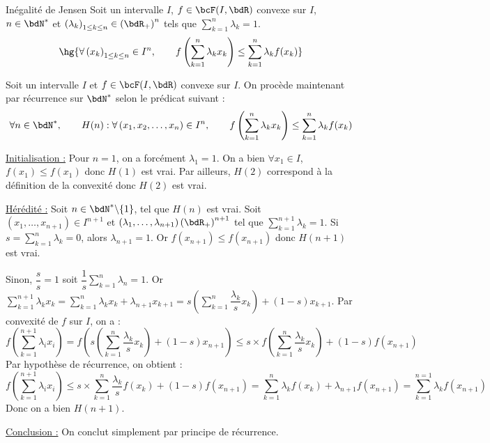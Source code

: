\documentclass[a4paper,french,bookmarks]{report}
\begin{document}
\begin{theorem}{Inégalité de Jensen}{}
    Soit un intervalle $I$, $f \in \bcF(I, \bdR)$ convexe sur $I$, $n \in \bdN^*$ et $\left(\lambda_k\right)_{1 \leq k \leq n} \in \left(\bdR_+\right)^n$ tels que $ \sum_{k=1}^n \lambda_k = 1$.
    \[ \hg{\forall \left(x_k\right)_{1 \leq k \leq n} \in I^n,\qquad f\left(\sum_{k=1}^n \lambda_kx_k\right) \leq \sum_{k=1}^n \lambda_kf(x_k)}\]
\end{theorem}

\begin{nproof}
    Soit un intervalle $I$ et $f \in \bcF(I, \bdR)$ convexe sur $I$. On procède maintenant par récurrence sur $\bdN^*$ selon le prédicat suivant :
    \[ \forall n \in \bdN^*,\qquad H(n) : \forall \left(x_1, x_2, \dots, x_n\right) \in I^n,\qquad f\left(\sum_{k=1}^n \lambda_kx_k\right) \leq \sum_{k=1}^n \lambda_kf(x_k)\]
    \begin{enumerate}
        \itt \underline{Initialisation :} Pour $n=1$, on a forcément $\lambda_1 = 1$. On a bien $\forall x_1 \in I$, $f(x_1) \leq f(x_1)$ donc $H(1)$ est vrai. Par ailleurs, $H(2)$ correspond à la définition de la convexité donc $H(2)$ est vrai.
            
        \itt \underline{Hérédité :} Soit $n \in \bdN^* \backslash \{ 1 \}$, tel que $H(n)$ est vrai. Soit $\left(x_1, \dots, x_{n+1}\right) \in I^{n+1}$ et $\left(\lambda_1, \dots, \lambda_{n+1}\right) \left(\bdR_+\right)^{n+1}$ tel que $\displaystyle\sum_{k=1}^{n+1} \lambda_k = 1$. Si $s = \displaystyle\sum_{k=1}^n \lambda_k = 0$, alors $\lambda_{n+1} = 1$. Or  $f(x_{n+1}) \leq f(x_{n+1})$ donc $H(n+1)$ est vrai.
            
        Sinon, $\dfrac{s}{s} = 1$ soit $\dfrac{1}{s}\displaystyle\sum_{k=1}^n \lambda_n = 1$. Or $\displaystyle \sum_{k=1}^{n+1} \lambda_kx_k = \sum_{k=1}^{n} \lambda_kx_k + \lambda_{n+1}x_{k+1} = s\left(\sum_{k=1}^{n} \dfrac{\lambda_k}{s}x_k\right) + (1-s)x_{k+1}$. Par convexité de $f$ sur $I$, on a :
        \[ f\left(\sum_{k=1}^{n+1} \lambda_ix_i\right) = f\left( s\left(\sum_{k=1}^{n} \dfrac{\lambda_k}{s}x_k\right) + (1-s)x_{n+1}\right) \leq s\times f\left(\sum_{k=1}^n \dfrac{\lambda_k}{s}x_k\right) + (1-s)f(x_{n+1})\]
        Par hypothèse de récurrence, on obtient :
        \[ f\left(\sum_{k=1}^{n+1} \lambda_ix_i\right) \leq s\times \sum_{k=1}^n \dfrac{\lambda_k}{s}f\left(x_k\right) + (1-s)f(x_{n+1}) = \sum_{k=1}^n \lambda_kf(x_k) + \lambda_{n+1}f(x_{n+1}) = \sum_{k=1}^{n=1}\lambda_kf(x_{n+1})\]
        Donc on a bien $H(n+1)$.
            
        \itt \underline{Conclusion :} On conclut simplement par principe de récurrence.
    \end{enumerate}
\end{nproof}
\end{document}
